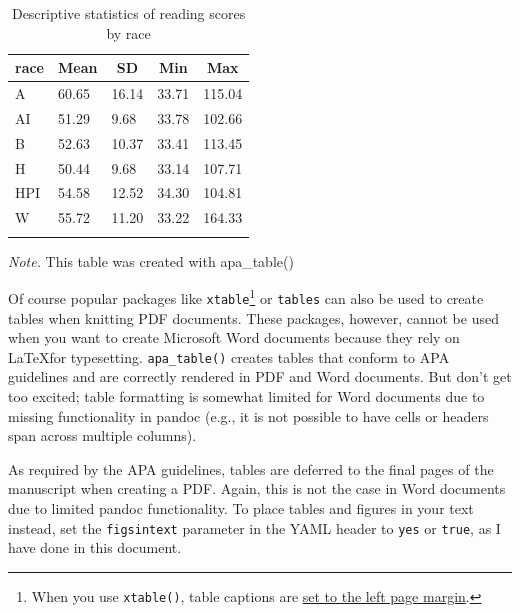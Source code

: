 \documentclass[
  english,
  man]{apa6}
\begin{document}
\begin{table}[tbp]

\begin{center}
\begin{threeparttable}

\caption{\label{tab:unnamed-chunk-2}Descriptive statistics of reading scores by race}

\begin{tabular}{lllll}
\toprule
race & \multicolumn{1}{c}{Mean} & \multicolumn{1}{c}{SD} & \multicolumn{1}{c}{Min} & \multicolumn{1}{c}{Max}\\
\midrule
A & 60.65 & 16.14 & 33.71 & 115.04\\
AI & 51.29 & 9.68 & 33.78 & 102.66\\
B & 52.63 & 10.37 & 33.41 & 113.45\\
H & 50.44 & 9.68 & 33.14 & 107.71\\
HPI & 54.58 & 12.52 & 34.30 & 104.81\\
W & 55.72 & 11.20 & 33.22 & 164.33\\
\bottomrule
\addlinespace
\end{tabular}

\begin{tablenotes}[para]
\normalsize{\textit{Note.} This table was created with apa\_table()}
\end{tablenotes}

\end{threeparttable}
\end{center}

\end{table}

Of course popular packages like \texttt{xtable}\footnote{When you use \texttt{xtable()}, table captions are \href{http://tex.stackexchange.com/questions/42209/centering-tables-in-document-class-apa6}{set to the left page margin}.} or \texttt{tables} can also be used to create tables when knitting PDF documents.
These packages, however, cannot be used when you want to create Microsoft Word documents because they rely on \LaTeX for typesetting.
\texttt{apa\_table()} creates tables that conform to APA guidelines and are correctly rendered in PDF and Word documents.
But don't get too excited; table formatting is somewhat limited for Word documents due to missing functionality in pandoc (e.g., it is not possible to have cells or headers span across multiple columns).

As required by the APA guidelines, tables are deferred to the final pages of the manuscript when creating a PDF.
Again, this is not the case in Word documents due to limited pandoc functionality.
To place tables and figures in your text instead, set the \texttt{figsintext} parameter in the YAML header to \texttt{yes} or \texttt{true}, as I have done in this document.
\end{document}
